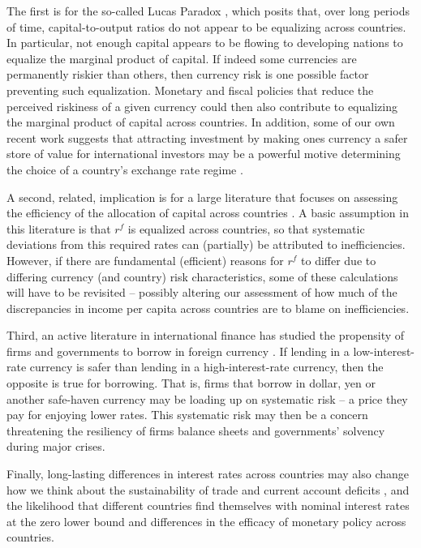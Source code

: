 \documentclass{ar-1col}
\begin{document}
The first is for the so-called Lucas Paradox \citep{Lucas1990}, which posits that, over long periods of time, capital-to-output ratios do not appear to be equalizing across countries. In particular, not enough capital appears to be flowing to developing nations to equalize the marginal product of capital. If indeed some currencies are permanently riskier than others, then currency risk is one possible factor preventing such equalization. Monetary and fiscal policies that reduce the perceived riskiness of a given currency could then also contribute to equalizing the marginal product of capital across countries. In addition, some of our own recent work suggests that attracting investment by making ones currency a safer store of value for international investors may be a powerful motive determining the choice of a country's exchange rate regime \citep{HassanMertensZhang2020}.

A second, related, implication is for a large literature that focuses on assessing the efficiency of the allocation of capital across countries \citep{HallJones1997, CaselliFeyrer2007}. A basic assumption in this literature is that $r^f$ is equalized across countries, so that systematic deviations from this required rates can (partially) be attributed to inefficiencies. However, if there are fundamental (efficient) reasons for $r^f$ to differ due to differing currency (and country) risk characteristics, some of these calculations will have to be revisited -- possibly altering our assessment of how much of the discrepancies in income per capita across countries are to blame on inefficiencies.

Third, an active literature in international finance has studied the propensity of firms and governments to borrow in foreign currency \citep{cespedes2004balance, du2016sovereign}. If lending in a low-interest-rate currency is safer than lending in a high-interest-rate currency, then the opposite is true for borrowing. That is, firms that borrow in dollar, yen or another safe-haven currency may be loading up on systematic risk -- a price they pay for enjoying lower rates. This systematic risk may then be a concern threatening the resiliency of firms balance sheets and governments' solvency during major crises.

Finally, long-lasting differences in interest rates across countries may also change how we think about the sustainability of trade and current account deficits \citep{GourinchasRey2007}, and the likelihood that different countries find themselves with nominal interest rates at the zero lower bound and differences in the efficacy of monetary policy across countries.
\end{document}
